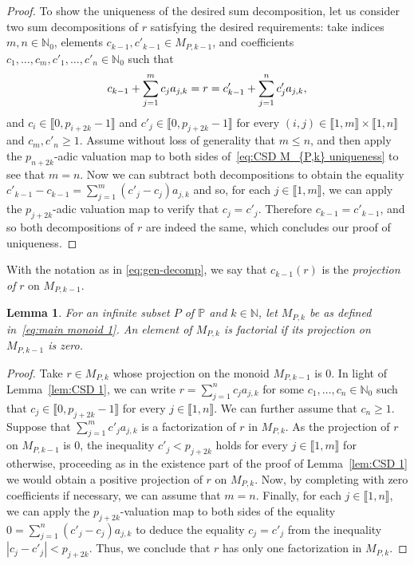 \documentclass[10pt]{amsart}
\newtheorem{lemma}[theorem]{Lemma}
\theoremstyle{definition}
\theoremstyle{remark}
\numberwithin{equation}{section}
\newcommand{\nn}{\mathbb{N}}
\newcommand{\pp}{\mathbb{P}}
\providecommand\ldb{\llbracket}
\providecommand\rdb{\rrbracket}
\begin{document}
\begin{proof}
  To show the uniqueness of the desired sum decomposition, let us consider two sum decompositions of $r$ satisfying the desired requirements: take indices $m,n \in \nn_0$, elements $c_{k-1}, c'_{k-1} \in M_{P,k-1}$, and coefficients $c_1, \dots, c_m, c'_1, \dots, c'_n \in \nn_0$ such that
  \begin{equation} \label{eq:CSD M_{P,k} uniqueness}
    c_{k-1} + \sum_{j=1}^{m} c_j a_{j,k} = r = c'_{k-1} + \sum_{j=1}^{n} c'_j a_{j,k},
  \end{equation}
  and $c_i \in \ldb 0, p_{i + 2k} - 1 \rdb$ and $c'_j \in \ldb 0, p_{j + 2k} - 1 \rdb$ for every $(i,j) \in \ldb 1, m \rdb \times \ldb 1,n \rdb$ and $c_m, c'_n \ge 1$. Assume without loss of generality that $m \le n$, and then apply the $p_{n+2k}$-adic valuation map to both sides of~\eqref{eq:CSD M_{P,k} uniqueness} to see that $m=n$. Now we can subtract both decompositions to obtain the equality $c'_{k-1} - c_{k-1} = \sum_{j=1}^m (c'_j - c_j) a_{j,k}$ and so, for each $j \in \ldb 1,m \rdb$, we can apply the $p_{j + 2k}$-adic valuation map to verify that $c_j = c'_j$. Therefore $c_{k-1} = c'_{k-1}$, and so both decompositions of $r$ are indeed the same, which concludes our proof of uniqueness.
\end{proof}

With the notation as in \eqref{eq:gen-decomp}, we say that $c_{k-1}(r)$ is the \emph{projection of} $r$ on $M_{P,k-1}$.

\begin{lemma} \label{lem:If projection on M{P,k-1} is zero then factorial}
  For an infinite subset $P$ of $\pp$ and $k \in \nn$, let $M_{P,k}$ be as defined in~\eqref{eq:main monoid 1}. An element of $M_{P,k}$ is factorial if its projection on $M_{P,k-1}$ is zero.
\end{lemma}

\begin{proof}
  Take $r \in M_{P,k}$ whose projection on the monoid $M_{P,k-1}$ is $0$. In light of Lemma~\ref{lem:CSD 1}, we can write $r = \sum_{j=1}^n c_j a_{j,k}$ for some $c_1, \dots, c_n \in \nn_0$ such that $c_j \in \ldb 0, p_{j + 2k} - 1 \rdb$ for every $j \in \ldb 1,n \rdb$. We can further assume that $c_n \ge 1$. Suppose that $\sum_{j=1}^m c'_j a_{j,k}$ is a factorization of $r$ in $M_{P,k}$. As the projection of $r$ on $M_{P,k-1}$ is $0$, the inequality $c'_j < p_{j + 2k}$ holds for every $j \in \ldb 1,m \rdb$ for otherwise, proceeding as in the existence part of the proof of Lemma~\ref{lem:CSD 1} we would obtain a positive projection of $r$ on $M_{P,k}$. Now, by completing with zero coefficients if necessary, we can assume that $m=n$. Finally, for each $j \in \ldb 1,n \rdb$, we can apply the $p_{j+2k}$-valuation map to both sides of the equality $0 = \sum_{j=1}^n (c'_j - c_j)a_{j,k}$ to deduce the equality $c_j = c'_j$ from the inequality $|c_j - c'_j| < p_{j+2k}$. Thus, we conclude that $r$ has only one factorization in $M_{P,k}$.
\end{proof}
\end{document}
